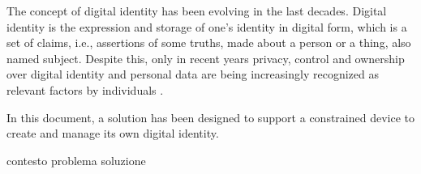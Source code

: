 
The concept of digital identity has been evolving in the last decades. Digital identity is the expression and storage of one's identity in digital form, which is a set of claims, i.e., assertions of some truths, made about a person or a thing, also named subject. Despite this, only in recent years privacy, control and ownership over digital identity and personal data are being increasingly recognized as relevant factors by individuals \cite{TheLawsOfIdentity}. 

In this document, a solution has been designed to support a constrained device to create and manage its own digital identity. 

contesto
problema
soluzione

